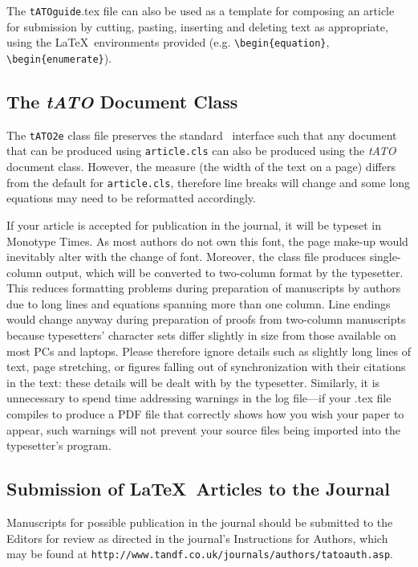 \documentclass{tATO2e}
\begin{document}
The \verb"tATOguide".tex file can also be used as a template for composing an article for submission by cutting, pasting, inserting and
deleting text as appropriate, using the \LaTeX\ environments provided (e.g. \verb"\begin{equation}", \verb"\begin{enumerate}").


\subsection{The {\em tATO} Document Class}\label{S1.1}

The \texttt{tATO2e} class file preserves the standard \LaTeXe\ interface such that any document that can
be produced using {\tt article.cls} can also be produced using the {\it tATO} document class.
However, the measure (the width of the text on a page) differs from the default for {\tt article.cls}, therefore line breaks
will change and some long equations may need to be reformatted accordingly.

If your article is accepted for publication in the journal, it will be typeset in Monotype Times. As most authors do not own this font, the page make-up would inevitably alter with the change of font. Moreover, the class file produces single-column output, which will be converted to two-column format by the typesetter. This reduces formatting problems during preparation of manuscripts by authors due to long lines and equations spanning more than one column. Line endings would change anyway during preparation of proofs from two-column manuscripts because typesetters' character sets differ slightly in size from those available on most PCs and laptops. Please therefore ignore details such as slightly long lines of text, page stretching, or figures falling out of synchronization with their citations in the text: these details will be dealt with by the typesetter. Similarly, it is unnecessary to spend time addressing warnings in the log file---if your .tex file compiles to produce a PDF file that correctly shows how you wish your paper to appear, such warnings will not prevent your source files being imported into the typesetter's program.


\subsection{Submission of \LaTeX\ Articles to the Journal}\label{S1.2}

Manuscripts for possible publication in the journal should be submitted to the Editors for review as directed in the journal's Instructions for Authors, which may be found at {\tt{http://www.tandf.co.uk/journals/authors/tatoauth.asp}}.
\end{document}
